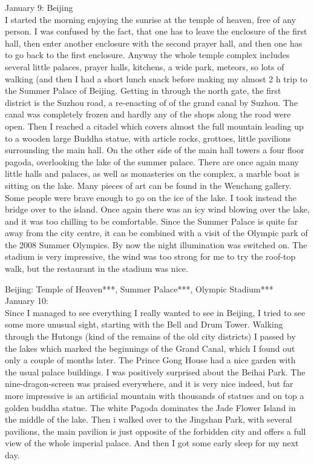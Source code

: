 January 9: Beijing\\
I started the morning enjoying the sunrise at the temple of heaven, free of any person. I was confused by the fact, that one has to leave the enclosure of the first hall, then enter another enclosure with the second prayer hall, and then one has to go back to the first enclosure. Anyway the whole temple complex includes several little palaces, prayer halls, kitchens, a wide park, meteors, so lots of walking (and then I had a short lunch snack before making my almost 2 h trip to the Summer Palace of Beijing. Getting in through the north gate, the first district is the Suzhou road, a re-enacting of of the grand canal by Suzhou. The canal was completely frozen and hardly any of the shops along the road were open. Then I reached a citadel which covers almost the full mountain leading up to a wooden large Buddha statue, with article rocks, grottoes, little pavilions surrounding the main hall. On the other side of the main hall towers a four floor pagoda, overlooking the lake of the summer palace. There are once again many little halls and palaces, as well as monasteries on the complex, a marble boat is sitting on the lake. Many pieces of art can be found in the Wenchang gallery. Some people were brave enough to go on the ice of the lake. I took instead the bridge over to the island. Once again there was an icy wind blowing over the lake, and it was too chilling to be comfortable. Since the Summer Palace is quite far away from the city centre, it can be combined with a visit of the Olympic park of the 2008 Summer Olympics. By now the night illumination was switched on. The stadium is very impressive, the wind was too strong for me to try the roof-top walk, but the restaurant in the stadium was nice.\

Beijing: Temple of Heaven***, Summer Palace***, Olympic Stadium***\\

January 10:\\
Since I managed to see everything I really wanted to see in Beijing, I tried to see some more unusual sight, starting with the Bell and Drum Tower. Walking through the Hutongs (kind of the remains of the old city districts) I passed by the lakes which marked the beginnings of the Grand Canal, which I found out only a couple of months later. The Prince Gong House had a nice garden with the usual palace buildings. I was positively surprised about the Beihai Park. The nine-dragon-screen was praised everywhere, and it is very nice indeed, but far more impressive is an artificial mountain with thousands of statues and on top a golden buddha statue. The white Pagoda dominates the Jade Flower Island in the middle of the lake. Then i walked over to the Jingshan Park, with several pavilions, the main pavilion is just opposite of the forbidden city and offers a full view of the whole imperial palace. And then I got some early sleep for my next day.\\

